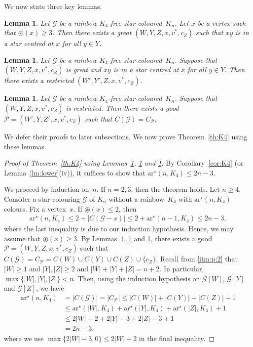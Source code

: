 \documentclass[a4paper, 12pt]{article}
\numberwithin{equation}{section}
\newtheorem{lemma}[theorem]{Lemma}
\def\sar{{\mathrm{ar}^{\star}}}
\def\cen{\circledast}
\newcommand{\mc}[1]{\mathcal{#1}}
\newcommand{\ms}[1]{\mathscr{#1}}
\begin{document}
We now state three key lemmas.


\begin{lemma}\label{lemma:initialgood}
Let $\ms{G}$ be a rainbow $K_4$-free star-coloured~$K_n$. 
Let $x$ be a vertex such that $\cen(x) \geq 3$.
Then there exists a great $(W,Y,Z,x,v^*,c_Z)$ such that $xy$ is in a star centred at $x$ for all $y \in Y$. 
\end{lemma}

\begin{lemma}\label{cl:Case2}
Let $\ms{G}$ be a rainbow $K_4$-free star-coloured~$K_n$. 
Suppose that $(W,Y,Z,x,v^*,c_Z)$ is great and $xy$ is in a star centred at $x$ for all $y \in Y$. 
Then there exists a restricted $(W',Y',Z,x,v^*,c_Z)$.
\end{lemma}


\begin{lemma}\label{cl:Case1}
Let $\ms{G}$ be a rainbow $K_4$-free star-coloured~$K_n$. 
Suppose that $(W,Y,Z,x,v^*,c_Z)$ is restricted.
Then there exists a good $\mc{P} = (W',Y,Z',x,v^*,c_Z)$ such that $C(\ms{G}) = C_{\mc{P}}$.
\end{lemma}


We defer their proofs to later subsections. 
We now prove Theorem~\ref{th:K4} using these lemmas. 

\begin{proof}[Proof of Theorem~\ref{th:K4} using Lemmas~\ref{lemma:initialgood}, \ref{cl:Case2} and \ref{cl:Case1}]
By Corollary~\ref{cor:K4} (or Lemma~\ref{lm:lower}(iv)), it suffices to show that $\sar(n, K_4) \le 2n-3$.

We proceed by induction on~$n$.
If $n =2,3$, then the theorem holds. 
Let $n \geq 4$.
Consider a star-colouring $\ms{G}$ of $K_n$ without a rainbow~$K_4$ with $\sar(n, K_4)$ colours. 
Fix a vertex~$x$. 
If $\cen(x) \leq 2$, then 
\begin{align*}
	\sar(n, K_4) \le 2 + |C(\ms{G}-x)| 
	\le 2+ \sar(n-1, K_4) 
	\le 2n-3,
\end{align*}
where the last inequality is due to our induction hypothesis. 
Hence, we may assume that $\cen(x) \ge 3$.
By Lemmas~\ref{lemma:initialgood}, \ref{cl:Case2} and \ref{cl:Case1}, there exists a good $\mc{P} = (W,Y,Z,x,v^*,c_Z)$ such that $C(\ms{G}) = C_{\mc{P}} = C(W) \cup C(Y) \cup C(Z) \cup \{c_Z\}$.
Recall from \ref{itm:p:2} that $|W| \geq 1$ and $|Y|,|Z| \ge 2$ and $|W|+|Y|+|Z|=n+2$. 
In particular, $\max\{|W|,|Y|,|Z|\}<n$.
Then, using the induction hypothesis on $\ms{G}[W]$, $\ms{G}[Y]$ and $\ms{G}[Z]$, we have
\begin{align*}
	\sar(n, K_4) &= |C(\ms{G})| =  |C_{\mc{P}}|
	\le |C(W)| + |C(Y)| +|C(Z)| +1\\
	&\le \sar(|W|, K_4) + \sar(|Y|, K_4) + \sar(|Z|, K_4)+1 \\
	&\le   2|W|-2 + 2|Y|-3 + 2|Z|-3 +1\\
    &= 2n-3,
\end{align*}
where we use $\max\{2|W|-3, 0\}\le 2|W|-2$ in the final inequality.
\end{proof}
\end{document}
